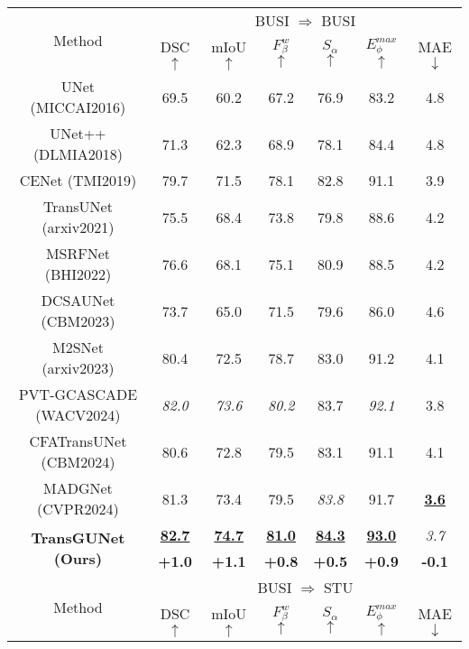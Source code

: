 \begin{table}[h]
    \centering
    \scriptsize
    \setlength\tabcolsep{2pt} %
    \renewcommand{\arraystretch}{0.9} %
    \begin{tabular}{c|cccccc}
    \hline
    \multicolumn{1}{c|}{\multirow{2}{*}{Method}} & \multicolumn{6}{c}{BUSI $\Rightarrow$ BUSI} \\ \cline{2-7}
     & DSC \scriptsize{$\uparrow$} & mIoU \scriptsize{$\uparrow$} & $F_{\beta}^{w}$ \scriptsize{$\uparrow$}  & $S_{\alpha}$ \scriptsize{$\uparrow$} & $E_{\phi}^{max}$ \scriptsize{$\uparrow$} & MAE \scriptsize{$\downarrow$} \\
     \hline
     UNet \tiny{(MICCAI2016)}       & 69.5 & 60.2 & 67.2 & 76.9 & 83.2 & 4.8 \\
     UNet++ \tiny{(DLMIA2018)}      & 71.3 & 62.3 & 68.9 & 78.1 & 84.4 & 4.8 \\
     CENet \tiny{(TMI2019)}         & 79.7 & 71.5 & 78.1 & 82.8 & 91.1 & 3.9 \\
     TransUNet \tiny{(arxiv2021)}   & 75.5 & 68.4 & 73.8 & 79.8 & 88.6 & 4.2 \\
     MSRFNet \tiny{(BHI2022)}       & 76.6 & 68.1 & 75.1 & 80.9 & 88.5 & 4.2 \\
     DCSAUNet \tiny{(CBM2023)}      & 73.7 & 65.0 & 71.5 & 79.6 & 86.0 & 4.6 \\
     M2SNet \tiny{(arxiv2023)}      & 80.4 & 72.5 & 78.7 & 83.0 & 91.2 & 4.1 \\
     PVT-GCASCADE \tiny{(WACV2024)} & \textit{82.0} & \textit{73.6} & \textit{80.2} & 83.7 & \textit{92.1} & 3.8 \\
     CFATransUNet \tiny{(CBM2024)}  & 80.6 & 72.8 & 79.5 & 83.1 & 91.1 & 4.1 \\
     MADGNet \tiny{(CVPR2024)}      & 81.3 & 73.4 & 79.5 & \textit{83.8} & 91.7 & \textbf{\underline{3.6}} \\
     \hline
     \multicolumn{1}{c|}{\multirow{2}{*}{\textbf{TransGUNet \tiny{(Ours)}}}}     & \textbf{\underline{82.7}} & \textbf{\underline{74.7}} & \textbf{\underline{81.0}} & \textbf{\underline{84.3}} & \textbf{\underline{93.0}} & \textit{3.7} \\ \cline{2-7}
     & \textbf{+1.0} & \textbf{+1.1} & \textbf{+0.8} & \textbf{+0.5} & \textbf{+0.9} & \textbf{-0.1} \\
    \hline
    \multicolumn{1}{c|}{\multirow{2}{*}{Method}} & \multicolumn{6}{c}{BUSI $\Rightarrow$ STU} \\ \cline{2-7}
     & DSC \scriptsize{$\uparrow$} & mIoU \scriptsize{$\uparrow$} & $F_{\beta}^{w}$ \scriptsize{$\uparrow$}  & $S_{\alpha}$ \scriptsize{$\uparrow$} & $E_{\phi}^{max}$ \scriptsize{$\uparrow$} & MAE \scriptsize{$\downarrow$} \\

\end{tabular}
\end{table}
